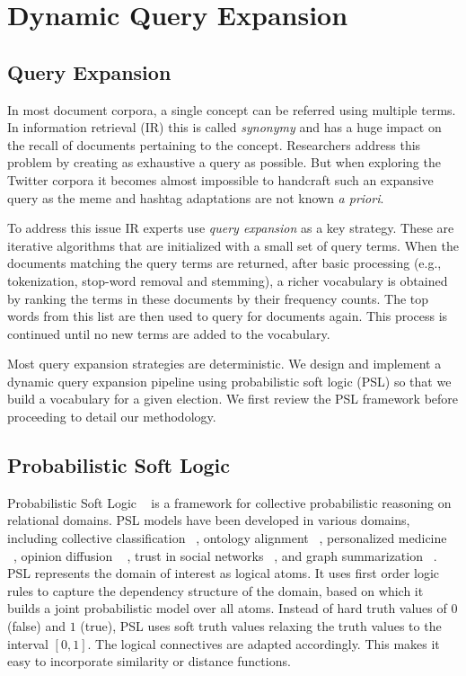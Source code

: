 \chapter{Dynamic Query Expansion}
\section{Query Expansion}
In most document corpora, a single concept can be referred using multiple terms.
In information retrieval (IR) this is called \emph{synonymy} and has a huge impact on the recall of documents pertaining to the concept.
Researchers address this problem by creating as exhaustive a query as possible. 
But when exploring the Twitter corpora it becomes almost impossible to handcraft such an expansive query as the meme and 
hashtag adaptations are not known {\it a priori}.

To address this issue IR experts use \emph{query expansion} as a key strategy.
These are iterative algorithms that are initialized with a small set of query terms. 
When the documents matching the query terms are returned, after basic processing (e.g.,
tokenization, stop-word removal and stemming), a richer vocabulary is obtained by ranking the 
terms in these documents by their frequency counts.
The top words from this list are then used to query for documents again. 
This process is continued until no new terms are added to the vocabulary. 

Most query expansion strategies are deterministic.
We design and implement a dynamic query expansion
pipeline using probabilistic soft logic (PSL) so that
we build a vocabulary for a given election. 
We first review the PSL framework before proceeding to detail our methodology.

\section{Probabilistic Soft Logic}
Probabilistic Soft Logic ~\cite{kimmig2012short} is a framework for collective probabilistic reasoning on relational domains.
PSL models have been developed in various domains, including collective classification ~\cite{broecheler2010computing}, ontology alignment ~\cite{brocheler2012probabilistic}, personalized medicine ~\cite{bach2010decision}, opinion diffusion ~\cite{bach2012scaling} , trust in social networks ~\cite{huang2012probabilistic}, and graph summarization ~\cite{memory2012graph}.
PSL represents the domain of interest as logical atoms.
It uses first order logic rules to capture the dependency structure of the domain, based on which it builds a joint probabilistic model over all atoms.
Instead of hard truth values of $0$ (false) and $1$ (true), PSL uses soft truth values relaxing the truth values to the interval $[0,1]$.
The logical connectives are adapted accordingly.
This makes it easy to incorporate similarity or distance functions.

